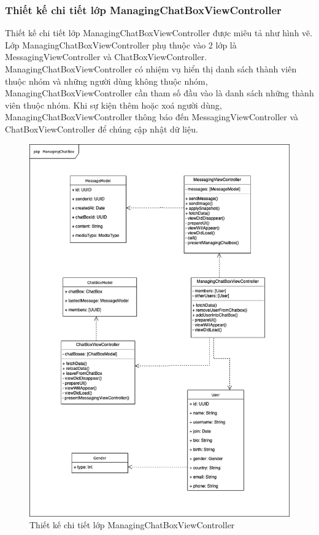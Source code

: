 \documentclass[../DoAn.tex]{subfiles}
\begin{document}
\subsubsection{Thiết kế chi tiết lớp ManagingChatBoxViewController}
Thiết kế chi tiết lớp ManagingChatBoxViewController được miêu tả như hình vẽ. Lớp ManagingChatBoxViewController phụ thuộc vào 2 lớp là MessagingViewController và ChatBoxViewController. ManagingChatBoxViewController có nhiệm vụ hiển thị danh sách thành viên thuộc nhóm và những người dùng không thuộc nhóm, ManagingChatBoxViewController cần tham số đầu vào là danh sách những thành viên thuộc nhóm. Khi sự kiện thêm hoặc xoá người dùng, ManagingChatBoxViewController thông báo đến MessagingViewController và ChatBoxViewController để chúng cập nhật dữ liệu.
\begin{figure}[H]
    \centering
    \includegraphics[width=1\linewidth]{Hinhve/Class/Detail_ManagingChatBoxViewController_Class_PKP.png}
    \caption{Thiết kế chi tiết lớp ManagingChatBoxViewController}
    \label{fig:use_case_tổng_quan}
\end{figure}
\end{document}
